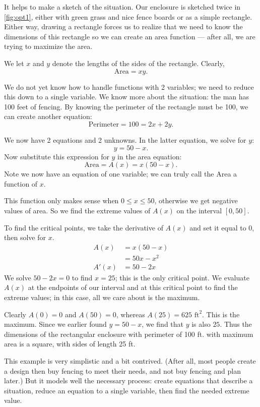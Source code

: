\begin{example}
It helps to make a sketch of the situation. Our enclosure is sketched twice in \autoref{fig:opt1}, either with green grass and nice fence boards or as a simple rectangle. Either way, drawing a rectangle forces us to realize that we need to know the dimensions of this rectangle so we can create an area function --- after all, we are trying to maximize the area.

We let $x$ and $y$ denote the lengths of the sides of the rectangle. Clearly, \[\text{Area}=xy.\]

We do not yet know how to handle functions with 2 variables; we need to reduce this down to a single variable. We know more about the situation: the man has 100 feet of fencing. By knowing the perimeter of the rectangle must be 100, we can create another equation:
\[\text{Perimeter} = 100 = 2x+2y.\]

We now have 2 equations and 2 unknowns. In the latter equation, we solve for $y$:
\[y = 50-x.\]
Now substitute this expression for $y$ in the area equation:
\[\text{Area} = A(x) = x(50-x).\]
Note we now have an equation of one variable; we can truly call the Area a function of $x$. 

This function only makes sense when $0\leq x \leq 50$, otherwise we get negative values of area. So we find the extreme values of $A(x)$ on the interval $[0,50]$. 

To find the critical points, we take the derivative of $A(x)$ and set it equal to 0, then solve for $x$.
\begin{align*}
A(x) &= x(50-x) \\
			&= 50x-x^2 \\
A'(x) 	&= 50-2x
\end{align*}
We solve $50-2x=0$ to find $x=25$; this is the only critical point. We evaluate $A(x)$ at the endpoints of our interval and at this critical point to find the extreme values; in this case, all we care about is the maximum.

Clearly $A(0)=0$ and $A(50)=0$, whereas $A(25) = 625 \text{ ft}^2$. This is the maximum. Since we earlier found $y = 50-x$, we find that $y$ is also $25$. Thus the dimensions of the rectangular enclosure with perimeter of 100 ft. with maximum area is a square, with sides of length 25 ft.
\end{example}

This example is very simplistic and a bit contrived. (After all, most people create a design then buy fencing to meet their needs, and not buy fencing and plan later.) But it models well the necessary process: create equations that describe a situation, reduce an equation to a single variable, then find the needed extreme value.


